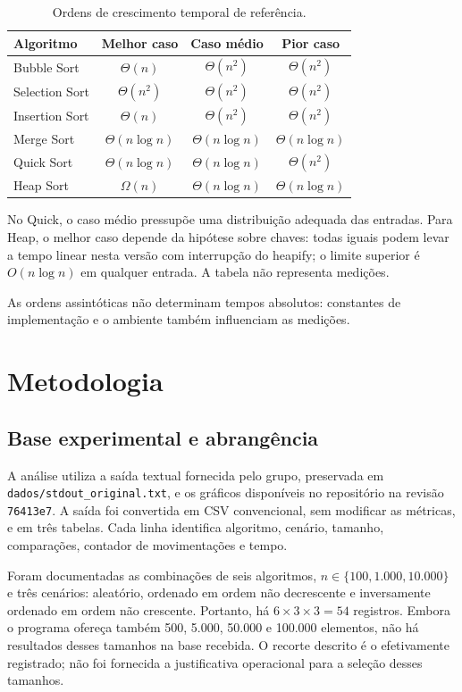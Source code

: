 \documentclass[12pt]{uftex}
\begin{document}
\begin{table}[htbp]\centering
\caption{Ordens de crescimento temporal de referência.}\label{tab:complexidade}
\begin{tabular}{lccc}\toprule
Algoritmo & Melhor caso & Caso médio & Pior caso \\\midrule
Bubble Sort & $\Theta(n)$ & $\Theta(n^2)$ & $\Theta(n^2)$ \\
Selection Sort & $\Theta(n^2)$ & $\Theta(n^2)$ & $\Theta(n^2)$ \\
Insertion Sort & $\Theta(n)$ & $\Theta(n^2)$ & $\Theta(n^2)$ \\
Merge Sort & $\Theta(n\log n)$ & $\Theta(n\log n)$ & $\Theta(n\log n)$ \\
Quick Sort & $\Theta(n\log n)$ & $\Theta(n\log n)$ & $\Theta(n^2)$ \\
Heap Sort & $\Omega(n)$ & $\Theta(n\log n)$ & $\Theta(n\log n)$ \\
\bottomrule\end{tabular}
\par\smallskip\footnotesize No Quick, o caso médio pressupõe uma distribuição adequada das entradas. Para Heap, o melhor caso depende da hipótese sobre chaves: todas iguais podem levar a tempo linear nesta versão com interrupção do heapify; o limite superior é $O(n\log n)$ em qualquer entrada. A tabela não representa medições.
\end{table}

As ordens assintóticas não determinam tempos absolutos: constantes de implementação e o ambiente também influenciam as medições.

\chapter{Metodologia}
\section{Base experimental e abrangência}
A análise utiliza a saída textual fornecida pelo grupo, preservada em \texttt{dados/stdout\_original.txt}, e os gráficos disponíveis no repositório na revisão \texttt{76413e7}. A saída foi convertida em CSV convencional, sem modificar as métricas, e em três tabelas. Cada linha identifica algoritmo, cenário, tamanho, comparações, contador de movimentações e tempo.

Foram documentadas as combinações de seis algoritmos, $n\in\{100,1.000,10.000\}$ e três cenários: aleatório, ordenado em ordem não decrescente e inversamente ordenado em ordem não crescente. Portanto, há $6\times3\times3=54$ registros. Embora o programa ofereça também 500, 5.000, 50.000 e 100.000 elementos, não há resultados desses tamanhos na base recebida. O recorte descrito é o efetivamente registrado; não foi fornecida a justificativa operacional para a seleção desses tamanhos.
\end{document}
